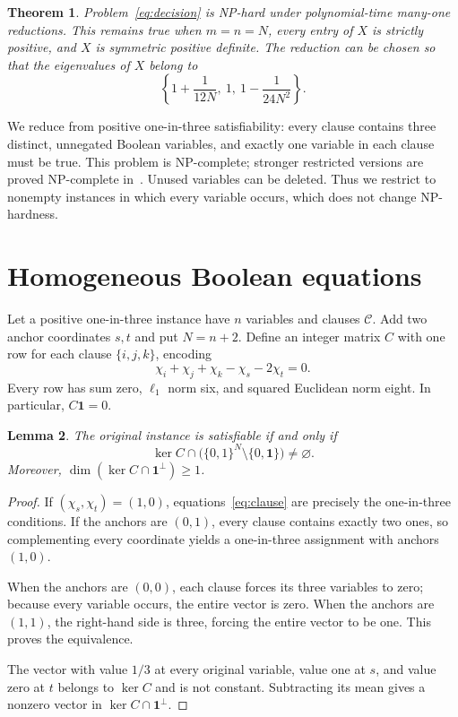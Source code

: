 \documentclass[11pt]{article}
\newtheorem{theorem}{Theorem}
\newtheorem{lemma}[theorem]{Lemma}
\newcommand{\one}{\mathbf 1}
\begin{document}
\begin{theorem}\label{thm:hard}
Problem~\eqref{eq:decision} is NP-hard under polynomial-time many-one reductions. This remains true when $m=n=N$, every entry of $X$ is strictly positive, and $X$ is symmetric positive definite. The reduction can be chosen so that the eigenvalues of $X$ belong to
\[
 \left\{1+\frac1{12N},\ 1,\ 1-\frac1{24N^2}\right\}.
\]
\end{theorem}

We reduce from positive one-in-three satisfiability: every clause contains three distinct, unnegated Boolean variables, and exactly one variable in each clause must be true. This problem is NP-complete; stronger restricted versions are proved NP-complete in~\cite{hmr}. Unused variables can be deleted. Thus we restrict to nonempty instances in which every variable occurs, which does not change NP-hardness.

\section{Homogeneous Boolean equations}
Let a positive one-in-three instance have $n$ variables and clauses $\mathcal C$. Add two anchor coordinates $s,t$ and put $N=n+2$. Define an integer matrix $C$ with one row for each clause $\{i,j,k\}$, encoding
\begin{equation}\label{eq:clause}
 \chi_i+\chi_j+\chi_k-\chi_s-2\chi_t=0.
\end{equation}
Every row has sum zero, $\ell_1$ norm six, and squared Euclidean norm eight. In particular, $C\one=0$.

\begin{lemma}\label{lem:boolean}
The original instance is satisfiable if and only if
\[
 \ker C\cap\bigl(\{0,1\}^N\setminus\{0,\one\}\bigr)\ne\varnothing.
\]
Moreover, $\dim(\ker C\cap\one^\perp)\geq1$.
\end{lemma}
\begin{proof}
If $(\chi_s,\chi_t)=(1,0)$, equations~\eqref{eq:clause} are precisely the one-in-three conditions. If the anchors are $(0,1)$, every clause contains exactly two ones, so complementing every coordinate yields a one-in-three assignment with anchors $(1,0)$.

When the anchors are $(0,0)$, each clause forces its three variables to zero; because every variable occurs, the entire vector is zero. When the anchors are $(1,1)$, the right-hand side is three, forcing the entire vector to be one. This proves the equivalence.

The vector with value $1/3$ at every original variable, value one at $s$, and value zero at $t$ belongs to $\ker C$ and is not constant. Subtracting its mean gives a nonzero vector in $\ker C\cap\one^\perp$.
\end{proof}
\end{document}
